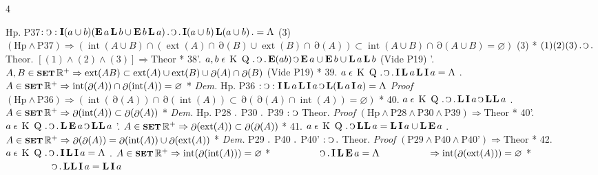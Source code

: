 \documentclass{book}
\newcommand{\s}{\switchcolumn} %
\newcommand{\C}{\mathop{\sbox0{$\displaystyle$$\reflectbox{C}$} %
\raisebox{-\height+\ht0-0.05cm}[\ht0][\dp0]{\scalebox{0.8}[0.8]{\copy0}}}\displaylimits} %
\newcommand{\p}{\mathop{\sbox0{$\displaystyle$$.$}
\raisebox{-\height+\ht0}[\ht0][\dp0]{\scalebox{1}[1]{\copy0}}}\displaylimits} %
\newcommand{\abs}{\mathop{\rotatebox[origin=c]{180}{V}}}
\newcommand{\smallIn}{\ensuremath{\mathrel{\epsilon}}}
\newcommand{\I}{\mathop{\textbf{I}}}
\newcommand{\E}{\mathop{\textbf{E}}}
\newcommand{\Lfat}{\mathop{\textbf{L}}}
\newcommand{\K}{\mathop{\thinspace \text{K} \thinspace}}
\newcommand{\Q}{\mathop{\thinspace \text{Q} \thinspace}}
\newcommand{\LfatLfat}{\mathop{\textbf{L\hspace{0.02cm}L}}}
\newcommand{\setOfSets}{\mathop{\text{{\footnotesize \textbf{SET}}}}}
\renewcommand{\rightarrow}{\Rightarrow}
\DeclareMathOperator{\interior}{int}
\DeclareMathOperator{\exterior}{ext}
\DeclareMathOperator{\boundary}{\partial}
\newenvironment{translateFourCol}[4]
               { %
                 \setcolumnwidth{#1\fill/1em, #2\fill/\columnsep, #3\fill/1em, #4\fill}
                 \begin{paracol}{4}
                 \newcommand{\LAT}{\switchcolumn[0]*}
                 \newcommand{\ENG}{\switchcolumn[2]}
               }
               { %
                 \let\ENG\undefined
                 \let\LAT\undefined
                 \end{paracol}
               }
\begin{document}
\begin{translateFourCol}{0.08}{0.42}{0.08}{0.42}
\raggedright
\s Hp. P37$: \C : \I (a \cup b)(\E a \Lfat b \cup \E b \Lfat a) \p \C \p \I (a \cup b) \Lfat (a \cup b) \p = \abs$ \hfill (3)
\ENG
\s $(\text{Hp} \wedge \text{P37}) \rightarrow (\interior(A \cup B) \cap (\exterior(A) \cap \boundary(B) \cup \exterior(B) \cap \boundary(A)) \subset \interior(A \cup B) \cap \boundary(A \cup B) = \varnothing)$ \hfill (3)
\LAT
\s $(1)(2)(3) \p \C \p$ Theor.
\ENG
\s $[(1) \wedge (2) \wedge (3)] \rightarrow \text{Theor}$
\LAT
38'. \s $a,b \smallIn \K \Q \p \C \p \E (ab) \C \E a \cup \E b \cup \Lfat a \Lfat b$ \hfill (Vide P19)
\ENG
38'. \s $A,B \in \setOfSets \mathbb{R}^+ \rightarrow \exterior(AB) \subset \exterior(A) \cup \exterior(B) \cup \boundary(A) \cap \boundary(B)$ \hfill (Vide P19)
\LAT
39. \s $a \smallIn \K \Q \p \C \p \I\Lfat a \Lfat\I a = \abs$
\ENG
39. \s $A \in \setOfSets \mathbb{R}^+ \rightarrow \interior(\boundary(A)) \cap \boundary(\interior(A)) = \varnothing$
\LAT
\emph{Dem.} \s Hp. P36 $: \C : \I\Lfat a \Lfat\I a \C \Lfat (\Lfat a \I a) = \abs$
\ENG
\emph{Proof} \s $(\text{Hp} \wedge \text{P36}) \rightarrow (\interior(\boundary(A)) \cap \boundary(\interior(A)) \subset \boundary(\boundary(A) \cap \interior(A)) = \varnothing)$
\LAT
40. \s $a \smallIn \K \Q \p \C \p \Lfat \I a \C \LfatLfat a$
\ENG
40. \s $A \in \setOfSets \mathbb{R}^+ \rightarrow \boundary(\interior(A)) \subset \boundary(\boundary(A))$
\LAT
\emph{Dem.} \s Hp. P28 $\p$ P30 $\p$ P39 $: \C$ Theor.
\ENG
\emph{Proof} \s $(\text{Hp} \wedge \text{P28} \wedge \text{P30} \wedge \text{P39}) \rightarrow \text{Theor}$
\LAT
40'. \s $a \smallIn \K \Q \p \C \p \Lfat \E a \C \LfatLfat a$
\ENG
40'. \s $A \in \setOfSets \mathbb{R}^+ \rightarrow \boundary(\exterior(A)) \subset \boundary(\boundary(A))$
\LAT
41. \s $a \smallIn \K \Q \p \C \LfatLfat a = \Lfat\I a \cup \Lfat\E a$
\ENG
41. \s $A \in \setOfSets \mathbb{R}^+ \rightarrow \boundary(\boundary(A)) = \boundary(\interior(A)) \cup \boundary(\exterior(A))$
\LAT
\emph{Dem.} \s P29 $\p$ P40 $\p$ P40' $: \C \p$ Theor.
\ENG
\emph{Proof} \s $(\text{P29} \wedge \text{P40} \wedge \text{P40'}) \rightarrow \text{Theor}$
\LAT
42. \s $a \smallIn \K \Q \p \C \p \I\Lfat\I a = \abs$
\ENG
42. \s $A \in \setOfSets \mathbb{R}^+ \rightarrow \interior(\boundary(\interior(A))) = \varnothing$
\LAT
\s $\hspace{1.68cm} \C \p \I\Lfat\E a = \abs$
\ENG
\s $\hspace{1.68cm} \rightarrow \interior(\boundary(\exterior(A))) = \varnothing$
\LAT
\s $\hspace{1.68cm} \C \p \LfatLfat\I a = \Lfat\I a$

\end{translateFourCol}
\end{document}
